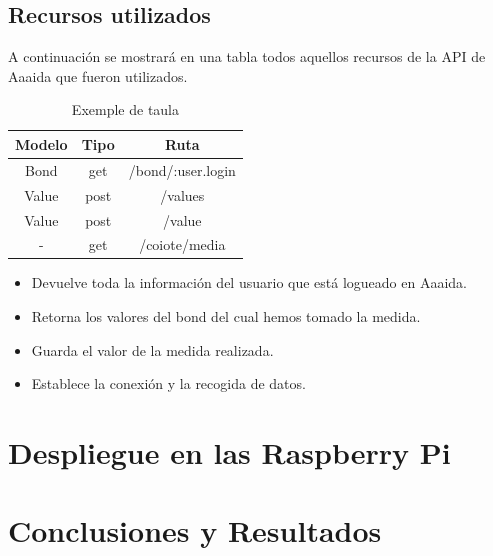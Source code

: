 \subsection{Recursos utilizados}

A continuación se mostrará en una tabla todos aquellos recursos de la API de Aaaida que fueron utilizados. 


\begin{table}[htb]

\begin{center}

\begin{tabular}{|c|c|c|}

\hline

{\bf Modelo} & {\bf Tipo} &

{\bf Ruta} \\ \hline \hline

Bond & get & /bond/:user.login  \\ \hline

Value & post & /values \\ \hline

Value & post & /value \\ \hline

- & get & /coiote/media \\ \hline

\end{tabular}

\caption{Exemple de taula}

\label{T:prova}

\end{center}

\end{table}

\begin{itemize}
\item Devuelve toda la información del usuario que está logueado en Aaaida.
\item Retorna los valores del bond del cual hemos tomado la medida.
\item Guarda el valor de la medida realizada. 
\item Establece la conexión y la recogida de datos.
\end{itemize}

\section{Despliegue en las Raspberry Pi}


\section{Conclusiones y Resultados}


